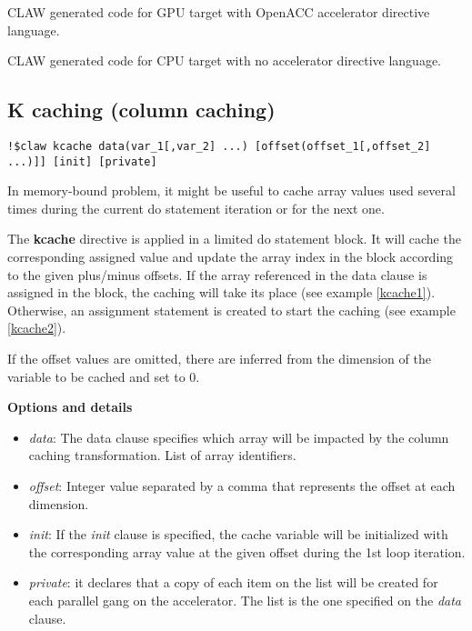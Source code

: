 CLAW generated code for GPU target with OpenACC accelerator directive language.


CLAW generated code for CPU target with no accelerator directive language.


\subsection{K caching (column caching)}
\begin{lstlisting}
!$claw kcache data(var_1[,var_2] ...) [offset(offset_1[,offset_2] ...)]] [init] [private]
\end{lstlisting}

In memory-bound problem, it might be useful to cache array values used several
times during the current do statement iteration or for the next one.

The \textbf{kcache} directive is applied in a limited do statement block. It
will cache the corresponding assigned value and update the array index in the
block according to the given plus/minus offsets. If the array referenced in the
data clause is assigned in the block, the caching will take its place (see
example \ref{kcache1}). Otherwise, an assignment statement is created to start
the caching (see example \ref{kcache2}).

If the offset values are omitted, there are inferred from the dimension of the
variable to be cached and set to 0.

\textbf{Options and details}
\begin{itemize}
\item \textit{data}: The data clause specifies which array will be impacted by
the column caching transformation. List of array identifiers.
\item \textit{offset}: Integer value separated by a comma that represents the
offset at each dimension.
\item \textit{init}: If the \textit{init} clause is specified, the cache
variable will be initialized with the corresponding array value at the given
offset during the 1st loop iteration.
\item \textit{private}: it declares that a copy of each item on the list will
be created for each parallel gang on the accelerator. The list is the one
specified on the \textit{data} clause.
\end{itemize}

